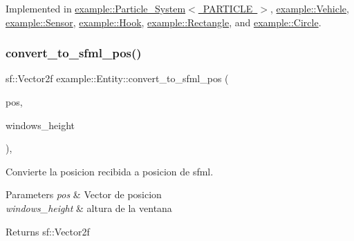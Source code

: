Implemented in \mbox{\hyperlink{classexample_1_1_particle___system_a82dfe08a8910532c5cd6a0a50fb79f23}{example\+::\+Particle\+\_\+\+System$<$ P\+A\+R\+T\+I\+C\+L\+E $>$}}, \mbox{\hyperlink{classexample_1_1_vehicle_ae8eeaa80a8a50a6402b313efca1dadba}{example\+::\+Vehicle}}, \mbox{\hyperlink{classexample_1_1_sensor_a0bc1b5c11b00ac855c35863ffc9c70d9}{example\+::\+Sensor}}, \mbox{\hyperlink{classexample_1_1_hook_a329b5437b6a05c621b8d0be35e326bb5}{example\+::\+Hook}}, \mbox{\hyperlink{classexample_1_1_rectangle_a547c35d87f139ffc190f542830606754}{example\+::\+Rectangle}}, and \mbox{\hyperlink{classexample_1_1_circle_ab8570fcf0357a37d6f9f354c0d02c725}{example\+::\+Circle}}.

\mbox{\label{classexample_1_1_entity_a4cddc45f96fdd98d7b1437cd0379b6c4}} 
\subsubsection{\texorpdfstring{convert\_to\_sfml\_pos()}{convert\_to\_sfml\_pos()}}
{\footnotesize\ttfamily sf\+::\+Vector2f example\+::\+Entity\+::convert\+\_\+to\+\_\+sfml\+\_\+pos (\begin{DoxyParamCaption}\item[{const b2\+Vec2 \&}]{pos,  }\item[{float}]{windows\+\_\+height }\end{DoxyParamCaption})\hspace{0.3cm}{\ttfamily [inline]}, {\ttfamily [protected]}}



Convierte la posicion recibida a posicion de sfml. 


\begin{DoxyParams}{Parameters}
{\em pos} & Vector de posicion \\
\hline
{\em windows\+\_\+height} & altura de la ventana \\
\hline
\end{DoxyParams}
\begin{DoxyReturn}{Returns}
sf\+::\+Vector2f 
\end{DoxyReturn}
\mbox{\label{classexample_1_1_entity_a0cbe31d17b04210ce4d4950937fe0002}} 
